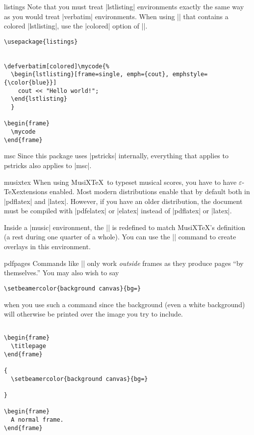 \begin{package}{{listings}}
  \beamernote
  Note that you must treat |lstlisting| environments exactly the same way as you would treat |verbatim| environments. When using || that contains a colored |lstlisting|, use the |colored| option of ||.
  \example
\begin{verbatim}
\usepackage{listings}


\defverbatim[colored]\mycode{%
  \begin{lstlisting}[frame=single, emph={cout}, emphstyle={\color{blue}}]
    cout << "Hello world!";
  \end{lstlisting}
  }

\begin{frame}
  \mycode
\end{frame}

\end{verbatim}
\end{package}

\begin{package}{{msc}}
  \beamernote
  Since this package uses |pstricks| internally, everything that applies to pstricks also applies to |msc|.
\end{package}

\begin{package}{{musixtex}}
  When using MusiX\TeX\ to typeset musical scores, you have to have $\varepsilon$-\TeX extensions enabled. Most modern distributions enable that by default both in |pdflatex| and |latex|. However, if you have an older distribution, the document must be compiled with |pdfelatex| or |elatex| instead of |pdflatex| or |latex|.

  Inside a |music| environment, the |\pause| is redefined to match MusiX\TeX's definition (a rest during one quarter of a whole). You can use the |\beamerpause| command to create overlays in this environment.
\end{package}

\begin{package}{{pdfpages}}
  Commands like || only work \emph{outside} frames as they produce pages ``by themselves.'' You may also wish to say
\begin{verbatim}
\setbeamercolor{background canvas}{bg=}
\end{verbatim}
  when you use such a command since the background (even a white background) will otherwise be printed over the image you try to include.

  \example
\begin{verbatim}

\begin{frame}
  \titlepage
\end{frame}

{
  \setbeamercolor{background canvas}{bg=}
  
}

\begin{frame}
  A normal frame.
\end{frame}

\end{verbatim}
\end{package}

